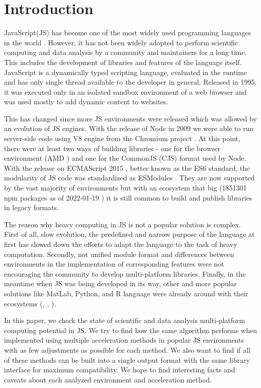 \section{Introduction}\label{sec:introduction}
JavaScript(JS) has become one of the most widely used programming languages in the world \cite{JSSurvey}. However, it has not been widely adopted to perform scientific computing and data analysis by a community and maintainers for a long time. This includes the development of libraries and features of the language itself. JavaScript is a dynamically typed scripting language, evaluated in the runtime and has only single thread available to the developer in general. Released in 1995, it was executed only in an isolated sandbox environment of a web browser \cite{SpeakingJS} and was used mostly to add dynamic content to websites.

This has changed since more JS environments were released which was allowed by an evolution of JS engines. With the release of Node \cite{node} in 2009 we were able to run server-side code using V8 engine \cite{V8} from the Chromium project \cite{Chromium}. At this point, there were at least two ways of building libraries - one for the browser environment (AMD \cite{calhoun_2014}) and one for the CommonJS (CJS) \cite{CJS} format used by Node. With the release on ECMAScript 2015 \cite{ES6}, better known as the ES6 standard, the modularity of JS code was standardized as ESModules \cite{ESModules}. They are now supported by the vast majority of environments but with an ecosystem that big (1851301 npm packages as of 2022-01-19 \cite{module_counts}) it is still common to build and publish libraries in legacy formats. 

The reason why heavy computing in JS is not a popular solution is complex. First of all, slow evolution, the predefined and narrow purpose of the language at first has slowed down the efforts to adapt the language to the task of heavy computation. Secondly, not unified module format and differences between environments in the implementation of corresponding features were not encouraging the community to develop multi-platform libraries. Finally, in the meantime when JS was being developed in its way, other and more popular solutions like MatLab, Python, and R language were already around with their ecosystems (\cite{matlab}, \cite{oliphant2007python}, \cite{gerrard2015mastering}).


In this paper, we check the state of scientific and data analysis multi-platform computing potential in JS. We try to find how the same algorithm performs when implemented using multiple acceleration methods in popular JS environments with as few adjustments as possible for each method. We also want to find if all of these methods can be built into a single output format with the same library interface for maximum compatibility. We hope to find interesting facts and caveats about each analyzed environment and acceleration method.

